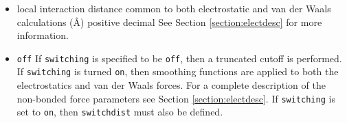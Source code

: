 \begin{itemize}


\item
{}%
{local interaction distance common to both electrostatic 
and van der Waals calculations (\AA)}%
{positive decimal}%
{%
See Section \ref{section:electdesc} for more information.}

\item
{}
{\verb!off!}
{If \verb!switching! is
specified to be \verb!off!, then a truncated cutoff is performed.
If \verb!switching! is turned \verb!on!, then smoothing functions
are applied to both the electrostatics and van der Waals forces.
For a complete description of the non-bonded force parameters see
Section \ref{section:electdesc}.  If \verb!switching! is set to
\verb!on!, then \verb!switchdist! must also be defined.}



\end{itemize}
